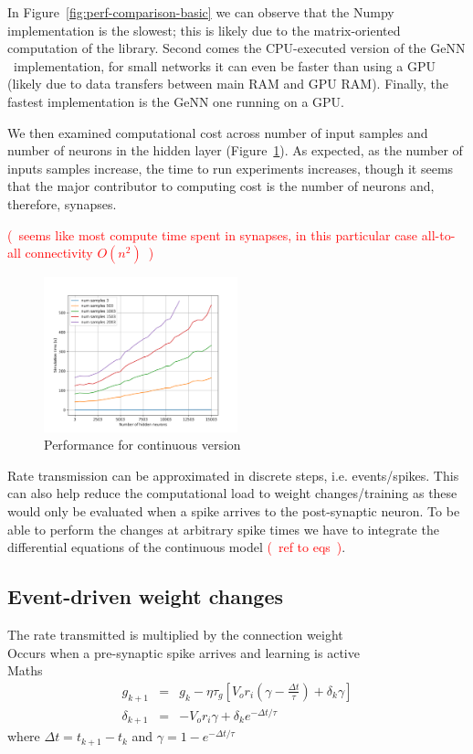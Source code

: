 \documentclass{article}
\newcommand{\genn}{{GeNN }}
\newcommand\note[1]{\textcolor{red}{(~#1~)}}
\begin{document}
In Figure~\ref{fig:perf-comparison-basic} we can observe that the Numpy implementation is the slowest; this is likely due to the matrix-oriented computation of the library.
Second comes the CPU-executed version of the \genn ~implementation, for small networks it can even be faster than using a GPU (likely due to data transfers between main RAM and GPU RAM).
Finally, the fastest implementation is the \genn one running on a GPU. 

We then examined computational cost across number of input samples and number of neurons in the hidden layer (Figure~\ref{fig:perf-genn-continuous}).
As expected, as the number of inputs samples increase, the time to run experiments increases, though it seems that the major contributor to computing cost is the number of neurons and, therefore, synapses.

\note{seems like most compute time spent in synapses, in this particular case all-to-all connectivity $O\left(n^2\right)$}

\begin{figure}[h!bt]
    \centering
    \includegraphics[width=0.5\textwidth]{perf_yinyang_lines.png}
    \caption{Performance for continuous version}
    \label{fig:perf-genn-continuous}
\end{figure}


Rate transmission can be approximated in discrete steps, i.e. events/spikes.
This can also help reduce the computational load to weight changes/training as these would only be evaluated when a spike arrives to the post-synaptic neuron. 
To be able to perform the changes at arbitrary spike times we have to integrate the differential equations of the continuous model \note{ref to eqs}.

\subsection{Event-driven weight changes}
The rate transmitted is multiplied by the connection weight\\
Occurs when a pre-synaptic spike arrives and learning is active\\
Maths\\
\begin{eqnarray}
g_{k+1} &=& g_{k} -\eta \tau_g \left[V_{o} r_{i} \left(\gamma -\frac{\Delta t}{\tau} \right)  + 
\delta_k \gamma \right] \\
\delta_{k+1} &=& -V_{o} r_{i} \gamma  + \delta_k e^{-\Delta t/\tau}
\end{eqnarray}
where $\Delta t = t_{k + 1} - t_k$ and $\gamma = 1 - e^{-\Delta t/\tau}$
\end{document}

